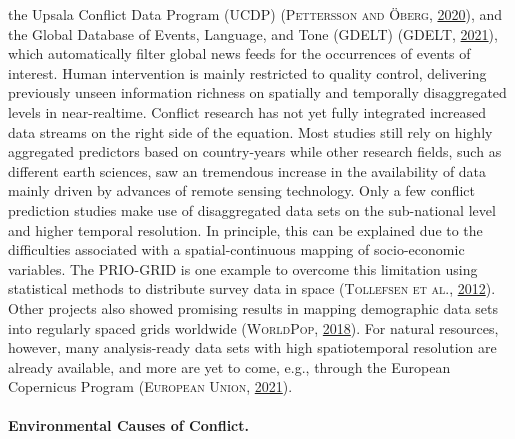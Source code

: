 \documentclass[a4paper,11pt]{article}
\begin{document}
the Upsala Conflict Data Program (UCDP) \textsc{(\textnormal{\textsc{Pettersson} and \textsc{Öberg}}, \textnormal{\protect\hyperlink{ref-pettersson2020}{2020}})}, and the Global Database of
Events, Language, and Tone (GDELT) \textsc{(\textnormal{\textsc{GDELT}}, \textnormal{\protect\hyperlink{ref-gdelt2021}{2021}})}, which automatically filter global
news feeds for the occurrences of events of interest.
Human intervention is mainly restricted to quality control, delivering previously
unseen information richness on spatially and temporally disaggregated levels in
near-realtime. Conflict research has not yet fully integrated increased data streams
on the right side of the equation. Most studies still rely on highly aggregated
predictors based on country-years while other research fields, such as different
earth sciences, saw an tremendous increase in the availability of data mainly driven
by advances of remote sensing technology.
Only a few conflict prediction studies make use of disaggregated data sets on the
sub-national level and higher temporal resolution. In principle, this can be explained due to the
difficulties associated with a spatial-continuous mapping of socio-economic variables.
The PRIO-GRID is one example to overcome this limitation using statistical methods
to distribute survey data in space \textsc{(\textnormal{\textsc{Tollefsen} \textsc{et al.}}, \textnormal{\protect\hyperlink{ref-tollefsen2012}{2012}})}. Other projects also showed
promising results in mapping demographic data sets into regularly spaced grids
worldwide \textsc{(\textnormal{\textsc{WorldPop}}, \textnormal{\protect\hyperlink{ref-worldpop2018}{2018}})}. For natural resources, however, many analysis-ready
data sets with high spatiotemporal resolution are already available, and more are yet
to come, e.g., through the European Copernicus Program \textsc{(\textnormal{\textsc{European Union}}, \textnormal{\protect\hyperlink{ref-europeanunion2021}{2021}})}.

\hypertarget{environmental-causes-of-conflict.}{%
\paragraph{Environmental Causes of Conflict.}\label{environmental-causes-of-conflict.}}
\end{document}
